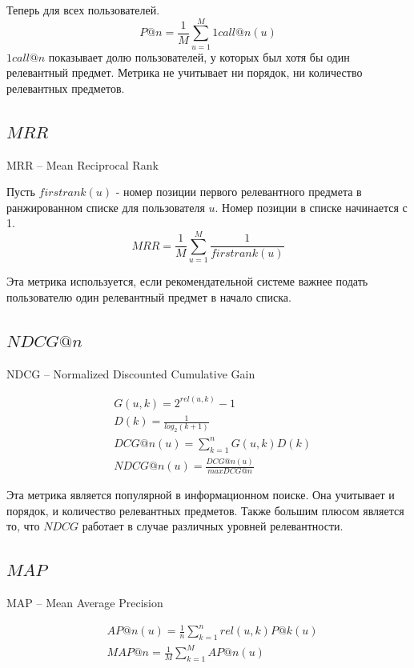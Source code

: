\documentclass[14pt]{extarticle}
\begin{document}
	Теперь для всех пользователей.
	\begin{equation*}
		P@n = \frac{1}{M}\sum_{u = 1}^M 1call@n(u)
	\end{equation*}
	$1call@n$ показывает долю пользователей, у которых был хотя бы один релевантный предмет. Метрика не учитывает  ни порядок, ни количество релевантных предметов. 
\subsection{$MRR$}
	MRR -- Mean Reciprocal Rank
	
	Пусть $firstrank(u)$  - номер позиции первого релевантного предмета в ранжированном списке для пользователя $u$. Номер позиции в списке начинается с 1.
	\begin{equation*}
		MRR = \frac{1}{M}\sum^{M}_{u=1}\frac{1}{firstrank(u)}	
	\end{equation*}
	
	Эта метрика используется, если рекомендательной системе важнее подать пользователю один релевантный предмет в начало списка. 

	 
\subsection{$NDCG@n$}
	NDCG -- Normalized Discounted Cumulative Gain
	
	\begin{equation*}
	\begin{split}
	 & G(u, k) = 2^{rel(u, k)} - 1 \\
	 & D(k) = \frac{1}{log_2(k + 1)} \\
	 & DCG@n(u) = \sum_{k=1}^n G(u, k) D(k) \\
	 & NDCG@n(u) = \frac{DCG@n(u)}{max DCG@n}
	\end{split}			
	\end{equation*}
	
	Эта метрика является популярной в информационном поиске. Она учитывает и порядок, и количество релевантных предметов. Также большим плюсом является то, что $NDCG$ работает в случае различных уровней релевантности.
	
\subsection{$MAP$}
	MAP -- 	Mean Average Precision
	
	
	\begin{equation*}
	\begin{split}
	 & AP@n(u) = \frac{1}{n}\sum_{k=1}^n rel(u, k) P@k(u)  \\
	 & MAP@n = \frac{1}{M}\sum_{k=1}^M AP@n(u) \\
	\end{split}			
	\end{equation*}
	
\end{document}
